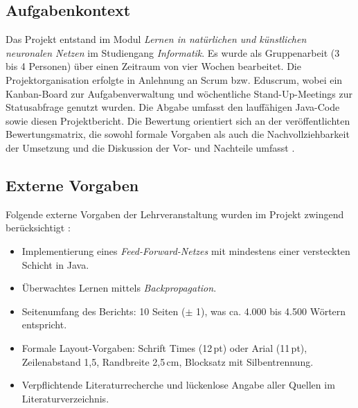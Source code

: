 \subsection{Aufgabenkontext}
Das Projekt entstand im Modul \emph{Lernen in natürlichen und künstlichen neuronalen Netzen} im Studiengang \emph{Informatik}. Es wurde als Gruppenarbeit (3 bis 4 Personen) über einen Zeitraum von vier Wochen bearbeitet. Die Projektorganisation erfolgte in Anlehnung an Scrum bzw. Eduscrum, wobei ein Kanban-Board zur Aufgabenverwaltung und wöchentliche Stand-Up-Meetings zur Statusabfrage genutzt wurden. Die Abgabe umfasst den lauffähigen Java-Code sowie diesen Projektbericht. Die Bewertung orientiert sich an der veröffentlichten Bewertungsmatrix, die sowohl formale Vorgaben als auch die Nachvollziehbarkeit der Umsetzung und die Diskussion der Vor- und Nachteile umfasst \cite{vieten_sw02}.

\subsection{Externe Vorgaben}
Folgende externe Vorgaben der Lehrveranstaltung wurden im Projekt zwingend berücksichtigt \cite{vieten_sw02}:
\begin{itemize}
	\item Implementierung eines \emph{Feed-Forward-Netzes} mit mindestens einer versteckten Schicht in Java.
	\item Überwachtes Lernen mittels \emph{Backpropagation}.
	\item Seitenumfang des Berichts: 10 Seiten (\(\pm\) 1), was ca. 4.000 bis 4.500 Wörtern entspricht.
	\item Formale Layout-Vorgaben: Schrift Times (12\,pt) oder Arial (11\,pt), Zeilenabstand 1,5, Randbreite 2,5\,cm, Blocksatz mit Silbentrennung.
	\item Verpflichtende Literaturrecherche und lückenlose Angabe aller Quellen im Literaturverzeichnis.
\end{itemize}

